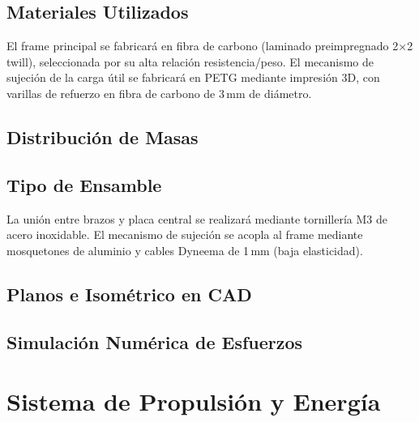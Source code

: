 \documentclass[10pt, twocolumn, letterpaper]{article}
\begin{document}
\subsection{Materiales Utilizados}
El frame principal se fabricará en fibra de carbono (laminado preimpregnado
2×2 twill), seleccionada por su alta relación resistencia/peso. El mecanismo
de sujeción de la carga útil se fabricará en PETG mediante impresión 3D, con
varillas de refuerzo en fibra de carbono de 3\,mm de diámetro.

\subsection{Distribución de Masas}
\noindent{}

\subsection{Tipo de Ensamble}
La unión entre brazos y placa central se realizará mediante tornillería M3 de
acero inoxidable. El mecanismo de sujeción se acopla al frame mediante
mosquetones de aluminio y cables Dyneema de 1\,mm (baja elasticidad).

\subsection{Planos e Isométrico en CAD}
\noindent{}

\subsection{Simulación Numérica de Esfuerzos}
\noindent{}

\section{Sistema de Propulsión y Energía}
\end{document}
